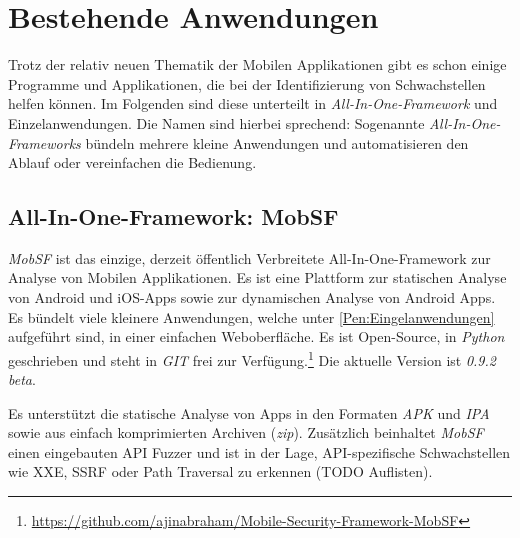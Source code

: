 \section{Bestehende Anwendungen}
Trotz der relativ neuen Thematik der Mobilen Applikationen gibt es schon einige Programme und Applikationen, die bei der Identifizierung von Schwachstellen helfen können. Im Folgenden sind diese unterteilt in \textit{All-In-One-Framework} und Einzelanwendungen. Die Namen sind hierbei sprechend: Sogenannte \textit{All-In-One-Frameworks} bündeln mehrere kleine Anwendungen und automatisieren den Ablauf oder vereinfachen die Bedienung.

\subsection{All-In-One-Framework: MobSF}
\textit{MobSF} ist das einzige, derzeit öffentlich Verbreitete All-In-One-Framework zur Analyse von Mobilen Applikationen. Es ist eine Plattform zur statischen Analyse von Android und iOS-Apps sowie zur dynamischen Analyse von Android Apps. Es bündelt viele kleinere Anwendungen, welche unter \ref{Pen:Eingelanwendungen} aufgeführt sind, in einer einfachen Weboberfläche. Es ist Open-Source, in \textit{Python} geschrieben und steht in \textit{GIT} frei zur Verfügung.\footnote{\url{https://github.com/ajinabraham/Mobile-Security-Framework-MobSF}} Die aktuelle Version ist \textit{0.9.2 beta}.

Es unterstützt die statische Analyse von Apps in den Formaten \textit{APK} und \textit{IPA} sowie aus einfach komprimierten Archiven (\textit{zip}). Zusätzlich beinhaltet \textit{MobSF} einen eingebauten API Fuzzer und ist in der Lage, API-spezifische Schwachstellen wie XXE, SSRF oder Path Traversal zu erkennen (TODO Auflisten).

